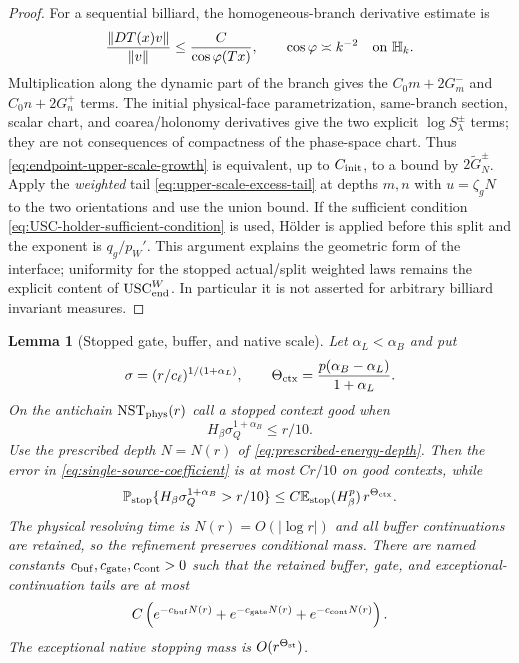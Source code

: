 \documentclass[11pt]{article}
\newtheorem{lemma}[theorem]{Lemma}
\begin{document}
\begin{proof}
For a sequential billiard, the homogeneous-branch derivative estimate is
\cite{DLcones}
\[
 \frac{\|DT(x)v\|}{\|v\|}\le\frac{C}{\cos\varphi(Tx)},
 \qquad \cos\varphi\asymp k^{-2}\quad\hbox{on }\mathbb H_k.
\]
Multiplication along the dynamic part of the branch gives the $C_0m+2G_m^-$
and $C_0n+2G_n^+$ terms.  The initial physical-face parametrization,
same-branch section, scalar chart, and coarea/holonomy derivatives give the
two explicit $\log S_\lambda^\pm$ terms; they are not consequences of
compactness of the phase-space chart.  Thus
\eqref{eq:endpoint-upper-scale-growth} is equivalent, up to
$C_{\rm init}$, to a bound by $2\widetilde G_N^\pm$.  Apply the
\emph{weighted} tail \eqref{eq:upper-scale-excess-tail} at depths $m,n$ with
$u=\zeta_gN$ to the two orientations and use the union bound.  If the
sufficient condition \eqref{eq:USC-holder-sufficient-condition} is used,
H\"older is applied before this split and the exponent is $q_g/p_W'$.  This
argument explains the geometric form of the interface; uniformity for the
stopped actual/split weighted laws remains the explicit content of
$\mathrm{USC}_{\rm end}^{W}$.  In particular it is not asserted for
arbitrary billiard invariant measures.
\end{proof}

\begin{lemma}[Stopped gate, buffer, and native scale]
\label{lem:gate-buffer}
Let $\alpha_L<\alpha_B$ and put
\begin{equation}
\label{eq:native-energy-scale}
 \sigma=(r/c_\ell)^{1/(1+\alpha_L)},\qquad
 \Theta_{\rm ctx}=\frac{p(\alpha_B-\alpha_L)}{1+\alpha_L}.
\end{equation}
On the antichain $\mathrm{NST}_{\rm phys}(r)$ call a stopped context good
when
\begin{equation}
\label{eq:joint-native-good-gate}
 H_\beta\sigma_Q^{1+\alpha_B}\le r/10.
\end{equation}
Use the prescribed depth $N=N(r)$ of
\eqref{eq:prescribed-energy-depth}.  Then the error in
\eqref{eq:single-source-coefficient} is at most $Cr/10$ on good contexts,
while
\begin{equation}
\label{eq:bad-context-native-scale}
 \mathbb P_{\rm stop}
 \{H_\beta\sigma_Q^{1+\alpha_B}>r/10\}
 \le C\mathbb E_{\rm stop}(H_\beta^p)\,r^{\Theta_{\rm ctx}}.
\end{equation}
The physical resolving time is $N(r)=O(|\log r|)$ and all buffer
continuations are retained, so the refinement preserves conditional mass.
There are named constants $c_{\rm buf},c_{\rm gate},c_{\rm cont}>0$ such
that the retained buffer, gate, and exceptional-continuation tails are at
most
\begin{equation}
\label{eq:named-energy-tails}
 C\left(e^{-c_{\rm buf}N(r)}+e^{-c_{\rm gate}N(r)}
 +e^{-c_{\rm cont}N(r)}\right).
\end{equation}
The exceptional native stopping mass is $O(r^{\Theta_{\rm st}})$.
\end{lemma}
\end{document}
